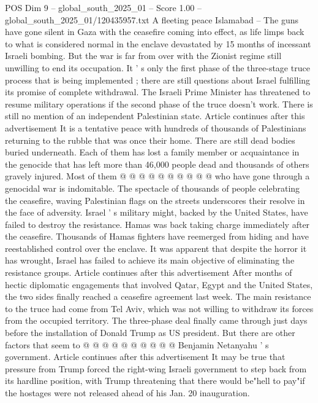 \begin{textsample}{POS Dim 9 – global\_south\_2025\_01 – Score 1.00 – global\_south\_2025\_01/120435957.txt}  \label{ex:f9_pos_313}
A fleeting peace Islamabad -- The guns have gone silent in Gaza with the ceasefire coming into effect, as life limps back to what is considered normal in the enclave devastated by 15 months of incessant Israeli bombing.
But the war is far from over with the Zionist regime still unwilling to end its occupation.
It ' s only the first phase of the three-stage truce process that is being implemented ; there are still questions about Israel fulfilling its promise of complete withdrawal.
The Israeli Prime Minister has threatened to resume military operations if the second phase of the truce doesn't work.
There is still no mention of an independent Palestinian state.
Article continues after this advertisement It is a tentative peace with hundreds of thousands of Palestinians returning to the rubble that was once their home.
There are still dead bodies buried underneath.
Each of them has lost a family member or acquaintance in the genocide that has left more than 46,000 people dead and thousands of others gravely injured.
Most of them @ @ @ @ @ @ @ @ @ @ who have gone through a genocidal war is indomitable.
The spectacle of thousands of people celebrating the ceasefire, waving Palestinian flags on the streets underscores their resolve in the face of adversity.
Israel ' s military might, backed by the United States, have failed to destroy the resistance.
Hamas was back taking charge immediately after the ceasefire.
Thousands of Hamas fighters have reemerged from hiding and have reestablished control over the enclave.
It was apparent that despite the horror it has wrought, Israel has failed to achieve its main objective of eliminating the resistance groups.
Article continues after this advertisement After months of hectic diplomatic engagements that involved Qatar, Egypt and the United States, the two sides finally reached a ceasefire agreement last week.
The main resistance to the truce had come from Tel Aviv, which was not willing to withdraw its forces from the occupied territory.
The three-phase deal finally came through just days before the installation of Donald Trump as US president.
But there are other factors that seem to @ @ @ @ @ @ @ @ @ @ Benjamin Netanyahu ' s government.
Article continues after this advertisement It may be true that pressure from Trump forced the right-wing Israeli government to step back from its hardline position, with Trump threatening that there would be"hell to pay"if the hostages were not released ahead of his Jan. 20 inauguration.

\end{textsample}
